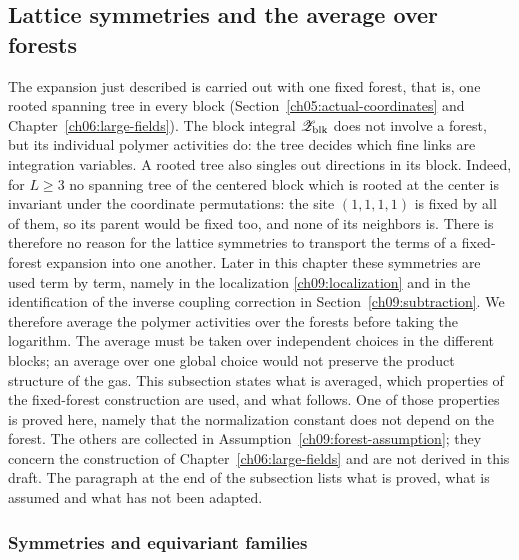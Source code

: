 \subsection{Lattice symmetries and the average over forests}
\label{ch09:forest-average}

The expansion just described is carried out with one fixed forest,
that is, one rooted spanning tree in every block
(Section~\ref{ch05:actual-coordinates} and
Chapter~\ref{ch06:large-fields}). The block integral
$\mathscr Z_{\rm blk}$ does not involve a forest, but its individual
polymer activities do: the tree decides which fine links are
integration variables. A rooted tree also singles out directions in its
block. Indeed, for $L\ge3$ no spanning tree of the centered block which
is rooted at the center is invariant under the coordinate permutations:
the site $(1,1,1,1)$ is fixed by all of them, so its parent would be
fixed too, and none of its neighbors is. There is therefore no reason
for the lattice symmetries to transport the terms of a fixed-forest
expansion into one another.
Later in this chapter these symmetries are used term by term, namely in
the localization \eqref{ch09:localization} and in the identification of
the inverse coupling correction in Section~\ref{ch09:subtraction}.
We therefore average the polymer activities over the forests before
taking the logarithm. The average must be taken over independent
choices in the different blocks; an average over one global choice
would not preserve the product structure of the gas. This subsection
states what is averaged, which properties of the fixed-forest
construction are used, and what follows. One of those properties is
proved here, namely that the normalization constant does not depend on the
forest. The others are collected in
Assumption~\ref{ch09:forest-assumption}; they concern the construction
of Chapter~\ref{ch06:large-fields} and are not derived in this draft.
The paragraph at the end of the subsection lists what is proved, what
is assumed and what has not been adapted.

\subsubsection*{Symmetries and equivariant families}

